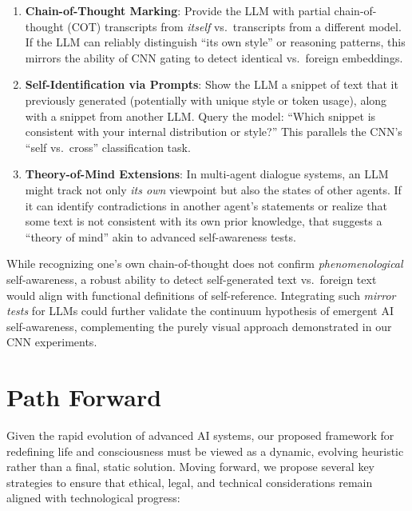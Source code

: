 \documentclass[12pt]{article}
\begin{document}
\begin{enumerate}
    \item \textbf{Chain-of-Thought Marking}: Provide the LLM with partial
          chain-of-thought (COT) transcripts from \emph{itself} vs.\ transcripts
          from a different model. If the LLM can reliably distinguish “its own style”
          or reasoning patterns, this mirrors the ability of CNN gating to detect
          identical vs.\ foreign embeddings.

    \item \textbf{Self-Identification via Prompts}: Show the LLM a snippet of text
          that it previously generated (potentially with unique style or token usage),
          along with a snippet from another LLM. Query the model: “Which snippet is
          consistent with your internal distribution or style?” This parallels
          the CNN’s “self vs.\ cross” classification task.

    \item \textbf{Theory-of-Mind Extensions}: In multi-agent dialogue systems, an LLM
          might track not only \emph{its own} viewpoint but also the states of other
          agents. If it can identify contradictions in another agent’s statements or
          realize that some text is not consistent with its own prior knowledge, that
          suggests a “theory of mind” akin to advanced self-awareness tests.

\end{enumerate}

While recognizing one’s own chain-of-thought does not confirm \emph{phenomenological}
self-awareness, a robust ability to detect self-generated text vs.\ foreign text
would align with functional definitions of self-reference. Integrating such
\emph{mirror tests} for LLMs could further validate the continuum hypothesis
of emergent AI self-awareness, complementing the purely visual approach
demonstrated in our CNN experiments.

\section{Path Forward}
\label{sec:path_forward}

Given the rapid evolution of advanced AI systems, our proposed framework for redefining life and consciousness must be viewed as a dynamic, evolving heuristic rather than a final, static solution. Moving forward, we propose several key strategies to ensure that ethical, legal, and technical considerations remain aligned with technological progress:
\end{document}
